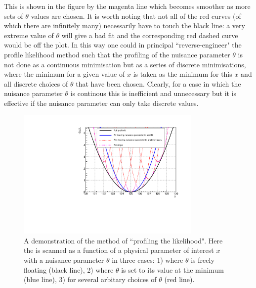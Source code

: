 This is shown in the figure by the magenta line which becomes smoother as more sets of $\theta$ values are chosen. It is worth noting that not all of the red curves (of which there are infinitely many) necessarily have to touch the black line: a very extreme value of $\theta$ will give a bad fit and the corresponding red dashed curve would be off the plot. In this way one could in principal ``reverse-engineer" the profile likelihood method such that the profiling of the nuisance parameter $\theta$ is not done as a continuous minimisation but as a series of discrete minimisations, where the minimum \NLL for a given value of $x$ is taken as the minimum \NLL for this $x$ and all discrete choices of $\theta$ that have been chosen. Clearly, for a case in which the nuisance parameter $\theta$ is continous this is inefficient and unnecessary but it is effective if the nuisance parameter can only take discrete values.

\begin{figure}
\begin{center}
  \includegraphics[width=0.8\textwidth]{ch5_anal_and_results/plots/envelope_explain.pdf}
  \caption{A demonstration of the method of ``profiling the likelihood". Here the \NLL is scanned as a function of a physical parameter of interest $x$ with a nuisance parameter $\theta$ in three cases: 1) where $\theta$ is freely floating (black line), 2) where $\theta$ is set to its value at the \NLL minimum (blue line), 3) for several arbitary choices of $\theta$ (red line).}
  \label{fig:envelope_explain1}
\end{center}
\end{figure}

